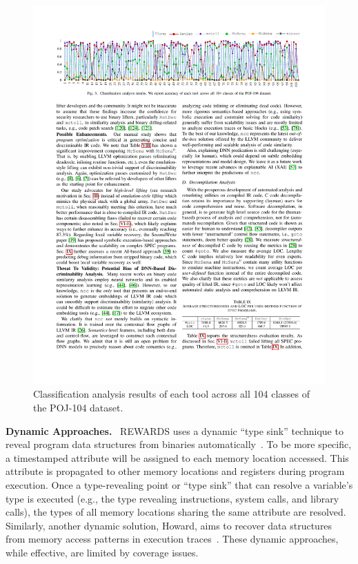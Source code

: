 \begin{figure}[tb]
  \centering
  \includegraphics[width=1.0\textwidth]{fig/ncc.pdf}
  \caption{Classification analysis results of each tool across all 104 classes of the POJ-104 dataset.}
  \label{fig:ncc}
\end{figure}

\noindent\textbf{Dynamic Approaches.}~
REWARDS uses a dynamic ``type sink'' technique to reveal program data structures from binaries automatically~\cite{lin2010automatic}. To be more specific, a timestamped attribute will be assigned to each memory location accessed. This attribute is propagated to other memory locations and registers during program execution. Once a type-revealing point or ``type sink'' that can resolve a variable's type is executed (e.g., the type revealing instructions, system calls, and library calls), the types of all memory locations sharing the same attribute are resolved. Similarly, another dynamic solution, Howard, aims to recover data structures from memory access patterns in execution traces~\cite{slowinska2011howard}. These dynamic approaches, while effective, are limited by coverage issues.

